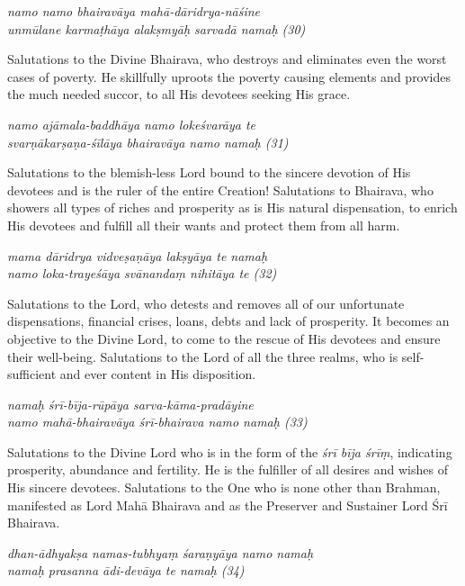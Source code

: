 \documentclass[11pt,oneside,a4paper]{article}
\newenvironment{shloka}[1]
  {\bigskip\center#1\varwidth{\linewidth}}
  {\endvarwidth\endcenter\bigskip}
\newcommand{\tl}[1]{\emph{#1}}
\begin{document}
\begin{shloka}\itshape
  namo namo bhairavāya mahā-dāridrya-nāśine\\
  unmūlane karmaṭhāya alakṣmyāḥ sarvadā namaḥ (30)
\end{shloka}

Salutations to the Divine Bhairava, who destroys and eliminates even the worst
cases of poverty. He skillfully uproots the poverty causing elements and
provides the much needed succor, to all His devotees seeking His grace.

\begin{shloka}\itshape
  namo ajāmala-baddhāya namo lokeśvarāya te\\
  svarṇākarṣaṇa-śīlāya bhairavāya namo namaḥ (31)
\end{shloka}

Salutations to the blemish-less Lord bound to the sincere devotion of His
devotees and is the ruler of the entire Creation! Salutations to Bhairava, who
showers all types of riches and prosperity as is His natural dispensation,
to enrich His devotees and fulfill all their wants and protect them from
all harm.

\begin{shloka}\itshape
  mama dāridrya vidveṣaṇāya lakṣyāya te namaḥ\\
  namo loka-trayeśāya svānandaṃ nihitāya te (32)
\end{shloka}

Salutations to the Lord, who detests and removes all of our unfortunate
dispensations, financial crises, loans, debts and lack of prosperity. It becomes
an objective to the Divine Lord, to come to the rescue of His devotees and
ensure their well-being. Salutations to the Lord of all the three realms, who is
self-sufficient and ever content in His disposition.

\begin{shloka}\itshape
  namaḥ śrī-bīja-rūpāya sarva-kāma-pradāyine\\
  namo mahā-bhairavāya śrī-bhairava namo namaḥ (33)
\end{shloka}

Salutations to the Divine Lord who is in the form of the \tl{śrī bīja śrīṃ},
indicating prosperity, abundance and fertility. He is the fulfiller of all
desires and wishes of His sincere devotees. Salutations to the One who is none
other than Brahman, manifested as Lord Mahā Bhairava and as the Preserver and
Sustainer Lord Śrī Bhairava.

\begin{shloka}\itshape
  dhan-ādhyakṣa namas-tubhyaṃ śaraṇyāya namo namaḥ\\
  namaḥ prasanna ādi-devāya te namaḥ (34)
\end{shloka}
\end{document}
